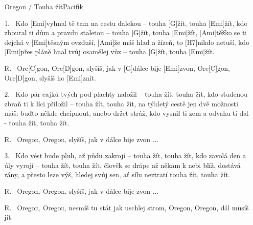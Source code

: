 \begin{song}{Oregon / Touha žít}{Pacifik}

\begin{xverse}{1.~}
Kdo [\large Emi]vyhnal tě tam na cestu dalekou --
touha [\large G]{}žít, touha [\large Emi]{}žít,
kdo zboural ti dům a pravdu staletou --
touha [\large G]{}žít, touha [\large Emi]{}žít,
[\large Ami]těžko se ti dejchá v [\large Emi]těsným ovzduší,
[\large Ami]{}že máš hlad a žízeň, to [\large H7]nikdo netuší,
kdo [\large Emi]přes pláně hnal tvůj osamělej vůz --
touha [\large G]{}žít, touha [\large Emi]{}žít.
\end{xverse}

\begin{xverse}{R.~}
Ore[\large C]gon, Ore[\large D]gon, slyšíš, jak v [\large G]dálce bije [\large Emi]zvon,
Ore[\large C]gon, Ore[\large D]gon, slyšíš ho [\large Emi]znít.
\end{xverse}

\begin{xverse}{2.~}
Kdo pár cajků tvých pod plachty naložil --
 touha žít, touha žít,
kdo studenou zbraň ti k líci přiložil --
 touha žít, touha žít,
na týhletý cestě jen dvě možnosti máš:
buďto někde chcípnout, anebo držet stráž,
kdo vysnil ti zem a odvahu ti dal - touha žít, touha žít.
\end{xverse}

\begin{xverse}{R.~}
Oregon, Oregon, slyšíš, jak v dálce bije zvon ...
\end{xverse}

\begin{xverse}{3.~}
Kdo vést bude pluh, až půdu zakrojí --
 touha žít, touha žít,
kdo zavolá den a úly vyrojí --
 touha žít, touha žít,
člověk se drápe až někam k nebi blíž,
dostává rány, a přesto leze výš,
hledej svůj sen, ať sílu neztratí touha žít, touha žít.
\end{xverse}

\begin{xverse}{R.~}
Oregon, Oregon, slyšíš, jak v dálce bije zvon ...
\end{xverse}

\begin{xverse}{R.~}
Oregon, Oregon, nesmíš tu stát jak uschlej strom,
Oregon, Oregon, dál musíš jít.
\end{xverse}

\end{song}

